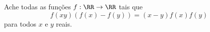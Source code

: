 Ache todas as funções $f: \RR \to \RR$ tais que
\[ f(xy) ( f(x) - f(y) ) = (x - y) f(x) f(y)\]
para todos $x$ e $y$ reais.
